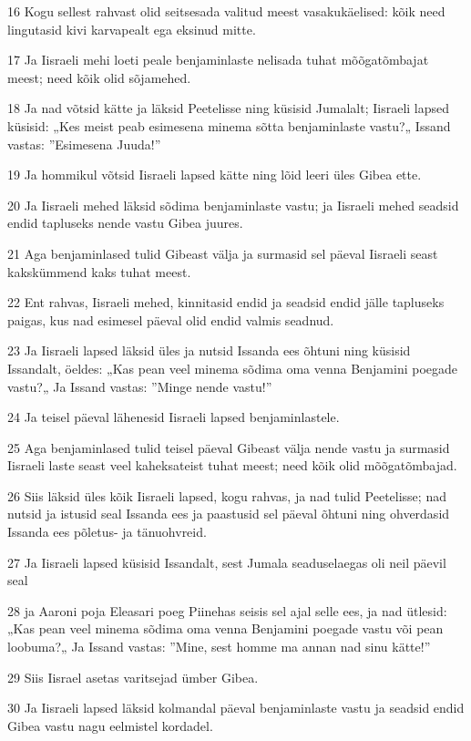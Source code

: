 \par 16 Kogu sellest rahvast olid seitsesada valitud meest vasakukäelised: kõik need lingutasid kivi karvapealt ega eksinud mitte.
\par 17 Ja Iisraeli mehi loeti peale benjaminlaste nelisada tuhat mõõgatõmbajat meest; need kõik olid sõjamehed.
\par 18 Ja nad võtsid kätte ja läksid Peetelisse ning küsisid Jumalalt; Iisraeli lapsed küsisid: „Kes meist peab esimesena minema sõtta benjaminlaste vastu?„ Issand vastas: ”Esimesena Juuda!”
\par 19 Ja hommikul võtsid Iisraeli lapsed kätte ning lõid leeri üles Gibea ette.
\par 20 Ja Iisraeli mehed läksid sõdima benjaminlaste vastu; ja Iisraeli mehed seadsid endid tapluseks nende vastu Gibea juures.
\par 21 Aga benjaminlased tulid Gibeast välja ja surmasid sel päeval Iisraeli seast kakskümmend kaks tuhat meest.
\par 22 Ent rahvas, Iisraeli mehed, kinnitasid endid ja seadsid endid jälle tapluseks paigas, kus nad esimesel päeval olid endid valmis seadnud.
\par 23 Ja Iisraeli lapsed läksid üles ja nutsid Issanda ees õhtuni ning küsisid Issandalt, öeldes: „Kas pean veel minema sõdima oma venna Benjamini poegade vastu?„ Ja Issand vastas: ”Minge nende vastu!”
\par 24 Ja teisel päeval lähenesid Iisraeli lapsed benjaminlastele.
\par 25 Aga benjaminlased tulid teisel päeval Gibeast välja nende vastu ja surmasid Iisraeli laste seast veel kaheksateist tuhat meest; need kõik olid mõõgatõmbajad.
\par 26 Siis läksid üles kõik Iisraeli lapsed, kogu rahvas, ja nad tulid Peetelisse; nad nutsid ja istusid seal Issanda ees ja paastusid sel päeval õhtuni ning ohverdasid Issanda ees põletus- ja tänuohvreid.
\par 27 Ja Iisraeli lapsed küsisid Issandalt, sest Jumala seaduselaegas oli neil päevil seal
\par 28 ja Aaroni poja Eleasari poeg Piinehas seisis sel ajal selle ees, ja nad ütlesid: „Kas pean veel minema sõdima oma venna Benjamini poegade vastu või pean loobuma?„ Ja Issand vastas: ”Mine, sest homme ma annan nad sinu kätte!”
\par 29 Siis Iisrael asetas varitsejad ümber Gibea.
\par 30 Ja Iisraeli lapsed läksid kolmandal päeval benjaminlaste vastu ja seadsid endid Gibea vastu nagu eelmistel kordadel.
